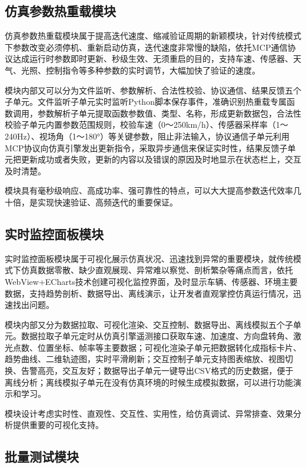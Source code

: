 \subsection{仿真参数热重载模块}

仿真参数热重载模块属于提高迭代速度、缩减验证周期的新颖模块，针对传统模式下参数改变必须停机、重新启动仿真，迭代速度非常慢的缺陷，依托MCP通信协议达成运行时参数即时更新、秒级生效、无须重启的目的，支持车速、传感器、天气、光照、控制指令等多种参数的实时调节，大幅加快了验证的速度。

模块内部又可以分为文件监听、参数解析、合法性校验、协议通信、结果反馈五个子单元。文件监听子单元实时监听Python脚本保存事件，准确识别热重载专属函数调用，参数解析子单元提取函数参数值、类型、名称，形成更新数据包，合法性校验子单元内置参数范围规则，校验车速（0～250km/h）、传感器采样率（1～240Hz）、视场角（1～180°）等关键参数，阻止非法输入，协议通信子单元利用MCP协议向仿真引擎发出更新指令，采取异步通信来保证实时性，结果反馈子单元把更新成功或者失败，更新的内容以及错误的原因及时地显示在状态栏上，交互及时清楚。

模块具有毫秒级响应、高成功率、强可靠性的特点，可以大大提高参数迭代效率几十倍，是实现快速验证、高频迭代的重要保证。

\subsection{实时监控面板模块}

实时监控面板模块属于可视化展示仿真状况、迅速找到异常的重要模块，就传统模式下仿真数据零散、缺少直观展现、异常难以察觉、剖析繁杂等痛点而言，依托WebView+ECharts技术创建可视化监控界面，及时显示车辆、传感器、环境主要数据，支持趋势剖析、数据导出、离线演示，让开发者直观掌控仿真运行情况，迅速找出问题。

模块内部又分为数据拉取、可视化渲染、交互控制、数据导出、离线模拟五个子单元。数据拉取子单元定时从仿真引擎遥测接口获取车速、加速度、方向盘转角、激光点数、位置坐标、帧率等主要数据；可视化渲染子单元把数据转化成指标卡片、趋势曲线、二维轨迹图，实时平滑刷新；交互控制子单元支持图表缩放、视图切换、告警高亮，交互友好；数据导出子单元一键导出CSV格式的历史数据，便于离线分析；离线模拟子单元在没有仿真环境的时候生成模拟数据，可以进行功能演示和学习。

模块设计考虑实时性、直观性、交互性、实用性，给仿真调试、异常排查、效果分析提供重要的可视化支持。

\subsection{批量测试模块}

